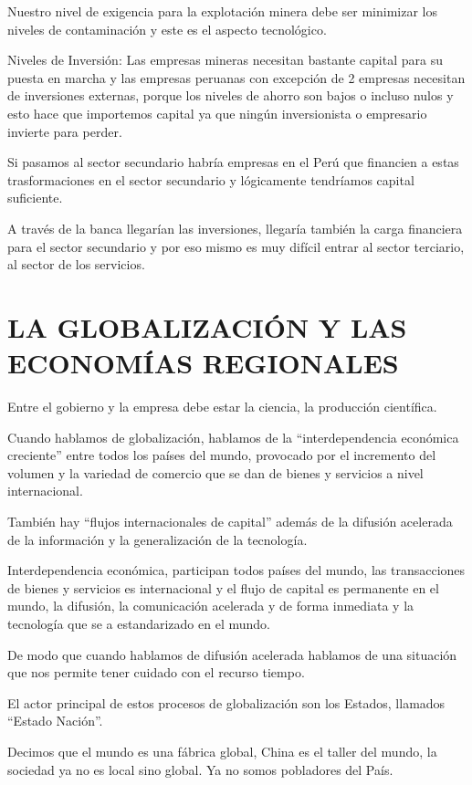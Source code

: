 \documentclass[
  a4paper,
]{article}
\begin{document}
Nuestro nivel de exigencia para la explotación minera debe ser minimizar
los niveles de contaminación y este es el aspecto tecnológico.

Niveles de Inversión: Las empresas mineras necesitan bastante capital
para su puesta en marcha y las empresas peruanas con excepción de 2
empresas necesitan de inversiones externas, porque los niveles de ahorro
son bajos o incluso nulos y esto hace que importemos capital ya que
ningún inversionista o empresario invierte para perder.

Si pasamos al sector secundario habría empresas en el Perú que financien
a estas trasformaciones en el sector secundario y lógicamente tendríamos
capital suficiente.

A través de la banca llegarían las inversiones, llegaría también la
carga financiera para el sector secundario y por eso mismo es muy
difícil entrar al sector terciario, al sector de los servicios.

\hypertarget{la-globalizaciuxf3n-y-las-economuxedas-regionales}{%
\section{LA GLOBALIZACIÓN Y LAS ECONOMÍAS
REGIONALES}\label{la-globalizaciuxf3n-y-las-economuxedas-regionales}}

Entre el gobierno y la empresa debe estar la ciencia, la producción
científica.

Cuando hablamos de globalización, hablamos de la ``interdependencia
económica creciente'' entre todos los países del mundo, provocado por el
incremento del volumen y la variedad de comercio que se dan de bienes y
servicios a nivel internacional.

También hay ``flujos internacionales de capital'' además de la difusión
acelerada de la información y la generalización de la tecnología.

Interdependencia económica, participan todos países del mundo, las
transacciones de bienes y servicios es internacional y el flujo de
capital es permanente en el mundo, la difusión, la comunicación
acelerada y de forma inmediata y la tecnología que se a estandarizado en
el mundo.

De modo que cuando hablamos de difusión acelerada hablamos de una
situación que nos permite tener cuidado con el recurso tiempo.

El actor principal de estos procesos de globalización son los Estados,
llamados ``Estado Nación''.

Decimos que el mundo es una fábrica global, China es el taller del
mundo, la sociedad ya no es local sino global. Ya no somos pobladores
del País.
\end{document}
